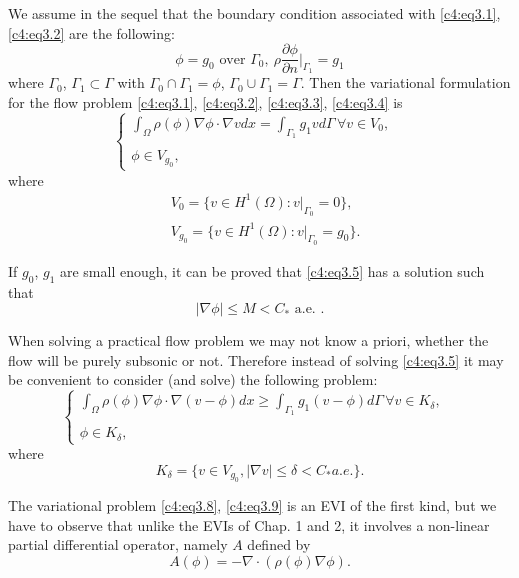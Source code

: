 We assume in the sequel that the boundary condition associated with
\eqref{c4:eq3.1}, \eqref{c4:eq3.2} are the following: 
\begin{equation}
\phi = g_0 \text{ over } \Gamma_0, ~\rho \frac{\partial \phi}{\partial
  n}|_{\Gamma_{1}} = g_1 \tag{3.4}\label{c4:eq3.4} 
\end{equation}
where $\Gamma_0$, $\Gamma_1 \subset \Gamma$ with $\Gamma_0 \cap
\Gamma_1 = \phi$, $\Gamma_0 \cup \Gamma_1 = \Gamma$. Then the
variational formulation for the flow problem \eqref{c4:eq3.1},
\eqref{c4:eq3.2}, \eqref{c4:eq3.3}, \eqref{c4:eq3.4} is  
\begin{equation}
\begin{cases}
\int_\Omega \rho (\phi) \nabla \phi \cdot \nabla v dx =
\int_{\Gamma_{1}} g_1 v d \Gamma\, \forall v \in V_0, \\ 
&\\
\phi \in V_{g_{0}},
\end{cases}\tag{3.5}\label{c4:eq3.5}
\end{equation}\pageoriginale 
where 
\begin{align}
& V_0 = \{v \in H^1(\Omega) : v|_{\Gamma_0} = 0\}, \tag{3.6}\label{c4:eq3.6}\\
& V_{g_0} = \{ v \in H^1 (\Omega) : v|_{\Gamma_0} =
  g_0\}. \tag{3.7}\label{c4:eq3.7} 
\end{align}

If $g_0$, $g_1$ are small enough, it can be proved that
\eqref{c4:eq3.5} has a solution such that  
$$
|\nabla \phi| \leq M < C_* \text{ a.e. }.
$$

When solving a practical flow problem we may not know a priori,
whether the flow will be purely subsonic or not. Therefore instead of
solving \eqref{c4:eq3.5} it may be convenient to consider (and solve)
the following problem:  
\begin{equation}
\begin{cases}
\int_\Omega \rho (\phi) \nabla \phi \cdot \nabla (v - \phi) dx \geq \int_{\Gamma_{1}} g_1(v - \phi) d \Gamma\, \forall v \in K_\delta,\\
&\\
\phi \in K_\delta,
\end{cases}\tag{3.8}\label{c4:eq3.8}
\end{equation}
where 
\begin{equation}
K_\delta = \{v \in V_{g_0}, |\nabla v| \leq \delta < C_* a. e. \}. \tag{3.9}\label{c4:eq3.9}
\end{equation}

The variational problem \eqref{c4:eq3.8}, \eqref{c4:eq3.9} is an EVI of the first kind, but we have to observe that unlike the EVIs of Chap. 1 and 2, it involves a non-linear partial differential operator, namely $A$ defined by 
$$
A(\phi) = - \nabla \cdot (\rho(\phi) \nabla \phi).
$$

